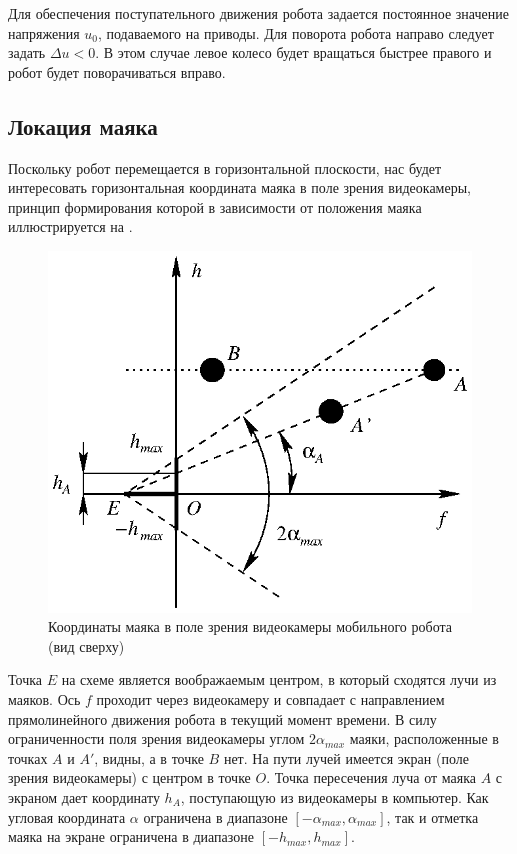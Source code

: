 Для обеспечения поступательного движения робота задается постоянное
значение напряжения $u_0$, подаваемого на приводы.  Для поворота
робота направо следует задать $\Delta u<0$.  В этом случае левое
колесо будет вращаться быстрее правого и робот будет поворачиваться
вправо.

\subsection{Локация маяка}

Поскольку робот перемещается в горизонтальной плоскости, нас будет
интересовать горизонтальная координата маяка в поле зрения
видеокамеры, принцип формирования которой в зависимости от положения
маяка иллюстрируется на .

\begin{figure}[h]
\centerline{\includegraphics{moby_eye_coord_h}}
\caption{Координаты маяка в поле зрения видеокамеры мобильного робота
         (вид сверху)}
\label{fig:moby_eye_coord}
\end{figure}

Точка $E$ на схеме является воображаемым центром, в который сходятся
лучи из маяков.  Ось $f$ проходит через видеокамеру и совпадает с
направлением прямолинейного движения робота в текущий момент времени.
В силу ограниченности поля зрения видеокамеры углом $2\alpha_{max}$
маяки, расположенные в точках $A$ и $A'$, видны, а в точке $B$ нет.
На пути лучей имеется экран (поле зрения видеокамеры) с центром в
точке $O$.  Точка пересечения луча от маяка $A$ с экраном дает
координату $h_A$, поступающую из видеокамеры в компьютер.  Как угловая
координата $\alpha$ ограничена в диапазоне $[-\alpha_{max},
\alpha_{max}]$, так и отметка маяка на экране ограничена в диапазоне
$[-h_{max}, h_{max}]$.

